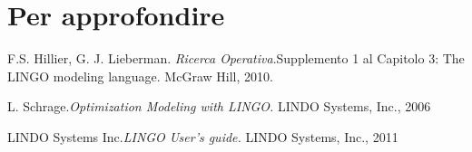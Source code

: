 \documentclass{beamer}
\def\lyxframeend{} %
\begin{document}
\lyxframeend{}

\lyxframeend{}\section{Per approfondire}


\lyxframeend{}

\beamertemplatebookbibitems
\begin{thebibliography}{References}
F.S. Hillier, G. J. Lieberman.\newblock
\textit{Ricerca Operativa}.\newblock Supplemento 1 al Capitolo 3:
The LINGO modeling language. McGraw Hill, 2010.

 L. Schrage.\newblock \emph{Optimization Modeling
with LINGO.} \newblock LINDO Systems, Inc., 2006

 LINDO Systems Inc.\newblock \emph{LINGO
User's guide.} \newblock LINDO Systems, Inc., 2011

\end{thebibliography}

\lyxframeend{}
\end{document}
